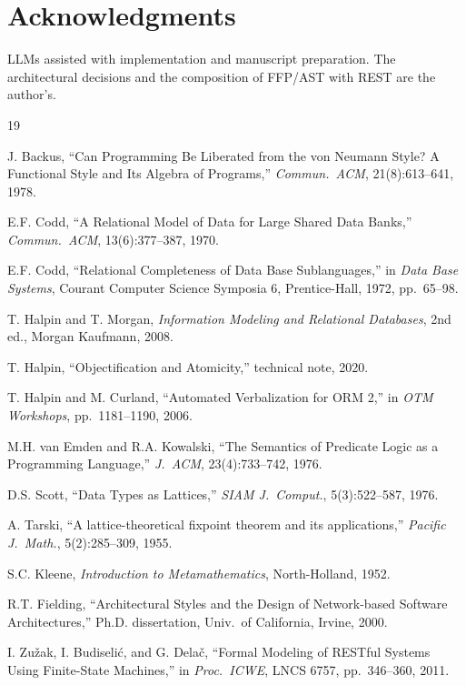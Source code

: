 \documentclass[10pt,twocolumn]{article}
\theoremstyle{plain}
\theoremstyle{definition}
\begin{document}
\section*{Acknowledgments}

LLMs assisted with implementation and manuscript preparation. The architectural decisions and the composition of FFP/AST with REST are the author's.



\begin{thebibliography}{19}
\small
\setlength{\itemsep}{0.15ex}
\setlength{\parskip}{0pt}

J. Backus, ``Can Programming Be Liberated from the von Neumann Style? A Functional Style and Its Algebra of Programs,'' \emph{Commun.\ ACM}, 21(8):613--641, 1978.

E.F. Codd, ``A Relational Model of Data for Large Shared Data Banks,'' \emph{Commun.\ ACM}, 13(6):377--387, 1970.

E.F. Codd, ``Relational Completeness of Data Base Sublanguages,'' in \emph{Data Base Systems}, Courant Computer Science Symposia 6, Prentice-Hall, 1972, pp.~65--98.

T. Halpin and T. Morgan, \emph{Information Modeling and Relational Databases}, 2nd ed., Morgan Kaufmann, 2008.

T. Halpin, ``Objectification and Atomicity,'' technical note, 2020.

T. Halpin and M. Curland, ``Automated Verbalization for ORM 2,'' in \emph{OTM Workshops}, pp.~1181--1190, 2006.

M.H. van Emden and R.A. Kowalski, ``The Semantics of Predicate Logic as a Programming Language,'' \emph{J.\ ACM}, 23(4):733--742, 1976.

D.S. Scott, ``Data Types as Lattices,'' \emph{SIAM J.\ Comput.}, 5(3):522--587, 1976.

A. Tarski, ``A lattice-theoretical fixpoint theorem and its applications,'' \emph{Pacific J.\ Math.}, 5(2):285--309, 1955.

S.C. Kleene, \emph{Introduction to Metamathematics}, North-Holland, 1952.

R.T. Fielding, ``Architectural Styles and the Design of Network-based Software Architectures,'' Ph.D. dissertation, Univ.\ of California, Irvine, 2000.

I. Zu\v{z}ak, I. Budiseli\'{c}, and G. Dela\v{c}, ``Formal Modeling of RESTful Systems Using Finite-State Machines,'' in \emph{Proc.\ ICWE}, LNCS 6757, pp.~346--360, 2011.


\end{thebibliography}
\end{document}
